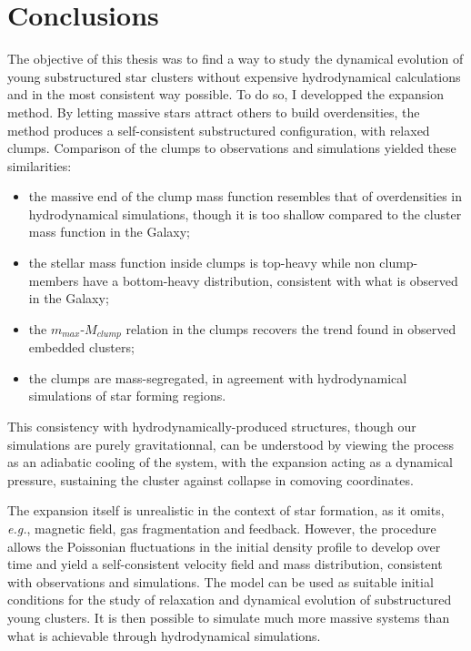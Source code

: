 \chapter{Conclusions}

The objective of this thesis was to find a way to study the dynamical evolution of young substructured star clusters without expensive hydrodynamical calculations and in the most consistent way possible. To do so, I developped the \HubLem expansion method. By letting massive stars attract others to build overdensities, the method produces a self-consistent substructured configuration, with relaxed clumps. Comparison of the clumps to observations and simulations yielded these similarities:

\begin{itemize}
\item the massive end of the clump mass function resembles that of overdensities in hydrodynamical simulations, though it is too shallow compared to the cluster mass function in the Galaxy;
\item the stellar mass function inside clumps is top-heavy while non clump-members have a bottom-heavy distribution, consistent with what is observed in the Galaxy;
\item the $m_{max}$-$M_{clump}$ relation in the clumps recovers the trend found in observed embedded clusters;
\item the clumps are mass-segregated, in agreement with hydrodynamical simulations of star forming regions.
\end{itemize}

This consistency with hydrodynamically-produced structures, though our simulations are purely gravitationnal, can be understood by viewing the \HubLem process as an adiabatic cooling of the system, with the expansion acting as a dynamical pressure, sustaining the cluster against collapse in comoving coordinates.

The expansion itself is unrealistic in the context of star formation, as it omits, \textit{e.g.}, magnetic field, gas fragmentation and feedback. However, the procedure allows the Poissonian fluctuations in the initial density profile to develop over time and yield a self-consistent velocity field and mass distribution, consistent with observations and simulations. The model can be used as suitable initial conditions for the study of relaxation and dynamical evolution of substructured young clusters. It is then possible to simulate much more massive systems than what is achievable through hydrodynamical simulations.

